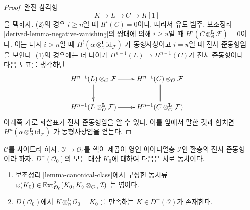 \begin{proof}
완전 삼각형
$$
K \to L \to C \to K[1]
$$
을 택하자. (2)의 경우 $i \geq n$일 때 $H^i(C) = 0$이다. 따라서
유도 범주, 보조정리 \ref{derived-lemma-negative-vanishing}의 쌍대에
의해 $i \geq n$일 때
$H^i(C \otimes_\mathcal{O}^\mathbf{L} \mathcal{F}) = 0$이다. 이는 다시
$i > n$일 때
$H^i(\alpha \otimes_\mathcal{O}^\mathbf{L} \text{id}_\mathcal{F})$
가 동형사상이고 $i = n$일 때 전사 준동형임을 보인다. (1)의 경우에는
더 나아가 $H^{n - 1}(L) \to H^{n - 1}(C)$가 전사 준동형이다.
다음 도표를 생각하면
$$
\xymatrix{
H^{n - 1}(L) \otimes_\mathcal{O} \mathcal{F} \ar[r] \ar[d] &
H^{n - 1}(C) \otimes_\mathcal{O} \mathcal{F} \ar@{=}[d] \\
H^{n - 1}(L \otimes_\mathcal{O}^\mathbf{L} \mathcal{F}) \ar[r] &
H^{n - 1}(C \otimes_\mathcal{O}^\mathbf{L} \mathcal{F})
}
$$
아래쪽 가로 화살표가 전사 준동형임을 알 수 있다. 이를 앞에서 말한 것과
합치면
$H^n(\alpha \otimes_\mathcal{O}^\mathbf{L} \text{id}_\mathcal{F})$
가 동형사상임을 얻는다.
\end{proof}

\begin{lemma}
\label{lemma-canonical-class-obstruction}
$\mathcal{C}$를 사이트라 하자. $\mathcal{O} \to \mathcal{O}_0$를 핵이
제곱이 영인 아이디얼층 $\mathcal{I}$인 환층의 전사 준동형이라 하자.
$D^-(\mathcal{O}_0)$의 모든 대상 $K_0$에 대하여 다음은 서로 동치이다.
\begin{enumerate}
\item 보조정리 \ref{lemma-canonical-class}에서 구성한 동치류
$\omega(K_0) \in
\mathop{\mathrm{Ext}}\nolimits^2_{\mathcal{O}_0}(K_0, K_0 \otimes_{\mathcal{O}_0} \mathcal{I})$
는 영이다.
\item $D(\mathcal{O}_0)$에서
$K \otimes_\mathcal{O}^\mathbf{L} \mathcal{O}_0 = K_0$
를 만족하는 $K \in D^-(\mathcal{O})$가 존재한다.
\end{enumerate}
\end{lemma}

